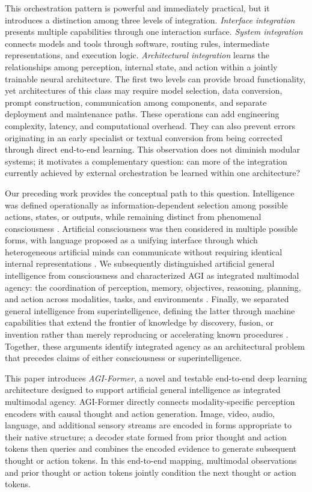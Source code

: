 This orchestration pattern is powerful and immediately practical, but it introduces a distinction among three levels of integration. \textit{Interface integration} presents multiple capabilities through one interaction surface. \textit{System integration} connects models and tools through software, routing rules, intermediate representations, and execution logic. \textit{Architectural integration} learns the relationships among perception, internal state, and action within a jointly trainable neural architecture. The first two levels can provide broad functionality, yet architectures of this class may require model selection, data conversion, prompt construction, communication among components, and separate deployment and maintenance paths. These operations can add engineering complexity, latency, and computational overhead. They can also prevent errors originating in an early specialist or textual conversion from being corrected through direct end-to-end learning. This observation does not diminish modular systems; it motivates a complementary question: can more of the integration currently achieved by external orchestration be learned within one architecture?

Our preceding work provides the conceptual path to this question. Intelligence was defined operationally as information-dependent selection among possible actions, states, or outputs, while remaining distinct from phenomenal consciousness \cite{zohourian2026intelligence}. Artificial consciousness was then considered in multiple possible forms, with language proposed as a unifying interface through which heterogeneous artificial minds can communicate without requiring identical internal representations \cite{zohourian2026language}. We subsequently distinguished artificial general intelligence from consciousness and characterized AGI as integrated multimodal agency: the coordination of perception, memory, objectives, reasoning, planning, and action across modalities, tasks, and environments \cite{zohourian2026agi}. Finally, we separated general intelligence from superintelligence, defining the latter through machine capabilities that extend the frontier of knowledge by discovery, fusion, or invention rather than merely reproducing or accelerating known procedures \cite{zohourian2026superintelligence}. Together, these arguments identify integrated agency as an architectural problem that precedes claims of either consciousness or superintelligence.

This paper introduces \textit{AGI-Former}, a novel and testable end-to-end deep learning architecture designed to support artificial general intelligence as integrated multimodal agency. AGI-Former directly connects modality-specific perception encoders with causal thought and action generation. Image, video, audio, language, and additional sensory streams are encoded in forms appropriate to their native structure; a decoder state formed from prior thought and action tokens then queries and combines the encoded evidence to generate subsequent thought or action tokens. In this end-to-end mapping, multimodal observations and prior thought or action tokens jointly condition the next thought or action tokens.

